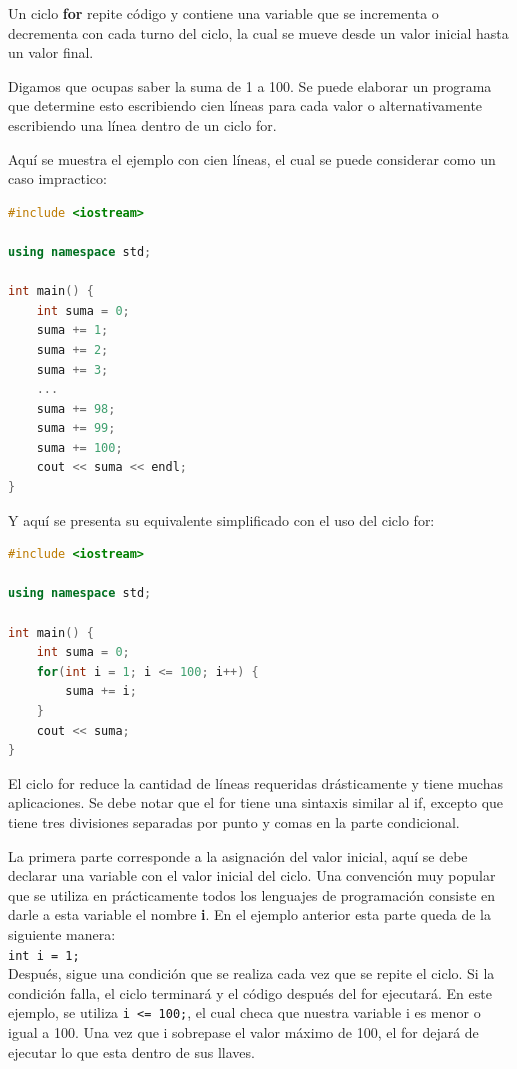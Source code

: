 \documentclass{article}
\begin{document}
Un ciclo \textbf{for} repite código y contiene una variable que se incrementa o decrementa con cada turno del ciclo, la cual se mueve desde un valor inicial hasta un valor final.

Digamos que ocupas saber la suma de 1 a 100. Se puede elaborar un programa que determine esto escribiendo cien líneas para cada valor o alternativamente escribiendo una línea dentro de un ciclo for.

Aquí se muestra el ejemplo con cien líneas, el cual se puede considerar como un caso impractico:

\begin{lstlisting}[language=C++, title=Suma línea por línea]
#include <iostream>

using namespace std;

int main() {
	int suma = 0;
	suma += 1;
	suma += 2;
	suma += 3;
	...
	suma += 98;
	suma += 99;
	suma += 100;
	cout << suma << endl;
}
\end{lstlisting}

Y aquí se presenta su equivalente simplificado con el uso del ciclo for:

\begin{lstlisting}[language=C++, title=Suma con ciclo for]
#include <iostream>

using namespace std;

int main() {
	int suma = 0;
	for(int i = 1; i <= 100; i++) {
		suma += i;
	}
	cout << suma;
}
\end{lstlisting}

El ciclo for reduce la cantidad de líneas requeridas drásticamente y tiene muchas aplicaciones. Se debe notar que el for tiene una sintaxis similar al if, excepto que tiene tres divisiones separadas por punto y comas en la parte condicional.

La primera parte corresponde a la asignación del valor inicial, aquí se debe declarar una variable con el valor inicial del ciclo. Una convención muy popular que se utiliza en prácticamente todos los lenguajes de programación consiste en darle a esta variable el nombre \textbf{i}. En el ejemplo anterior esta parte queda de la siguiente manera: \\

\lstinline{int i = 1;} \\

Después, sigue una condición que se realiza cada vez que se repite el ciclo. Si la condición falla, el ciclo terminará y el código después del for ejecutará. En este ejemplo, se utiliza \lstinline{i <= 100;}, el cual checa que nuestra variable i es menor o igual a 100. Una vez que i sobrepase el valor máximo de 100, el for dejará de ejecutar lo que esta dentro de sus llaves.
\end{document}
